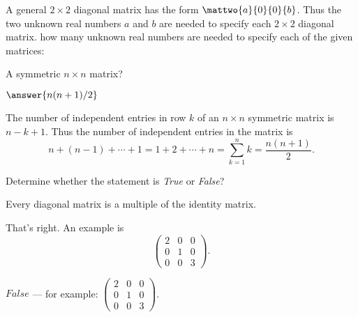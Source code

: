 \documentclass{article}
\begin{document}
\noindent A general $2\times 2$ diagonal matrix has the form $\mattwo{a}{0}{0}{b}$.  Thus the two unknown real numbers $a$ and $b$ are needed to specify each $2\times 2$ diagonal matrix.  how many unknown real numbers are needed to specify each of the given matrices:

\begin{exercise}  \label{c1.3.3c}
A symmetric $n\times n$ matrix?   
\begin{prompt}$\answer{n(n+1)/2}$\end{prompt}

\begin{solution}
The number of independent entries in row $k$ of an $n\times n$ symmetric matrix is $n-k+1$.  Thus the number of independent entries in the matrix is 
\[
n + (n-1) + \cdots + 1 = 1 + 2 + \cdots + n = \sum_{k=1}^n k = \frac{n(n + 1)}{2}.
\]
\end{solution}
\end{exercise}





\problemlabel

\noindent Determine whether the statement is {\em True\/} or {\em False\/}?

\begin{exercise} \label{c1.3.4b}
  Every diagonal matrix is a multiple of the identity matrix.
  \begin{multipleChoice}
  \end{multipleChoice}
  \begin{feedback}
    That's right.   An example is
    \[\left(\begin{array}{ccc}
              2 & 0 & 0 \\
              0 & 1 & 0 \\
              0 & 0 & 3 \end{array}\right).\]
  \end{feedback}

\begin{solution}
$False$ --- for example:
$\left(\begin{array}{ccc}
2 & 0 & 0 \\
0 & 1 & 0 \\
0 & 0 & 3 \end{array}\right)$.

\end{solution}
\end{exercise}
\end{document}
